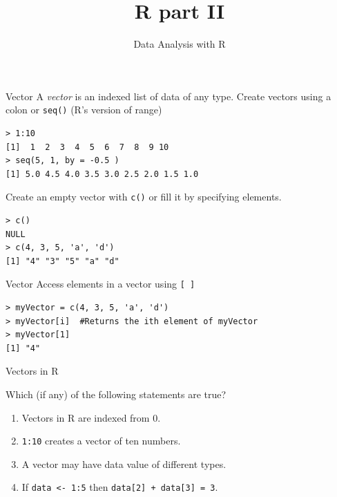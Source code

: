 \documentclass[xcolor=svgnames, 10pt, handout]{beamer}
\title
  [R]
  {R part II}
\subtitle{Data Analysis with R}
\begin{document}
\maketitle


\begin{frame}[fragile]{Vector}
A \emph{vector} is an indexed list of data of any type.
\vfill
Create vectors using a colon or \texttt{seq()} (R's version of range)
\begin{Verbatim}[commandchars=\\\{\}, xleftmargin=2em]
> 1:10
[1]  1  2  3  4  5  6  7  8  9 10
> seq(5, 1, by = -0.5 )
[1] 5.0 4.5 4.0 3.5 3.0 2.5 2.0 1.5 1.0
\end{Verbatim}
\vfill
Create an empty vector with \texttt{c()} or fill it by specifying elements.
\begin{Verbatim}[commandchars=\\\{\}, xleftmargin=2em]
> c()
NULL
> c(4, 3, 5, 'a', 'd')
[1] "4" "3" "5" "a" "d"
\end{Verbatim}
\end{frame}


\begin{frame}[fragile]{Vector}
Access elements in a vector using \texttt{[ ]}
\begin{Verbatim}[commandchars=\\\{\}, xleftmargin=2em]
> myVector = c(4, 3, 5, 'a', 'd')
> myVector[i]  #Returns the ith element of myVector
> myVector[1]
[1] "4"
\end{Verbatim}
\end{frame}


\begin{frame}[fragile]{Vectors in R}
\begin{question}
Which (if any) of the following statements are true?
\begin{enumerate}
\item Vectors in R are indexed from 0.  \onslide<+-> \pxmark
\item \texttt{1:10} creates a vector of ten numbers. \pcmark
\item A vector may have data value of different types. \pcmark
\item If \texttt{data <- 1:5} then \texttt{data[2] + data[3] = 3}. \pxmark
\end{enumerate}
\end{question}
\end{frame}
\end{document}
